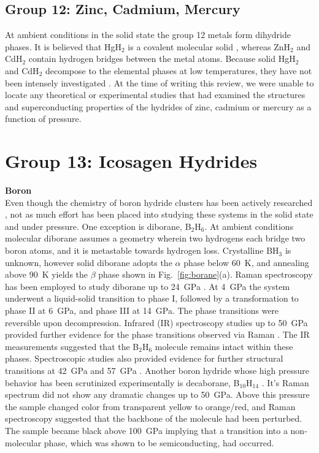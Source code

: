 \documentclass[12pt,letterpaper,oneside]{article}
\begin{document}
\subsection{Group 12: Zinc, Cadmium, Mercury}

At ambient conditions in the solid state the group 12 metals form dihydride phases. It is believed that HgH$_2$ is a covalent molecular solid \cite{Wang:2005a}, whereas ZnH$_2$ and CdH$_2$ contain hydrogen bridges between the metal atoms. Because solid HgH$_2$ and CdH$_2$ decompose to the elemental phases at low temperatures, they have not been intensely investigated  \cite{Shayesteh:2005}. At the time of writing this review, we were unable to locate any theoretical or experimental studies that had examined the structures and superconducting properties of the hydrides of zinc, cadmium or mercury as a function of pressure.

\section{Group 13: Icosagen Hydrides}

\textbf{Boron}\\
Even though the chemistry of boron hydride clusters has been actively researched \cite{Greenwood:1992}, not as much effort has been placed into studying these systems in the solid state and under pressure. One exception is diborane, B$_2$H$_6$. 
At ambient conditions molecular diborane assumes a geometry wherein two hydrogens each bridge two boron atoms, and it is metastable towards hydrogen loss. Crystalline BH$_3$ is unknown, however solid diborane adopts the $\alpha$ phase below 60~K, and annealing above 90~K yields the $\beta$ phase shown in Fig.\ \ref{fig:borane}(a). 
%
Raman spectroscopy has been employed to study diborane up to 24~GPa \cite{Murli:2009a}. At 4~GPa the system underwent a liquid-solid transition to phase I, followed by a transformation to phase II at 6~GPa, and phase III at 14~GPa. The phase transitions were reversible upon decompression. Infrared (IR) spectroscopy studies up to 50~GPa  provided further evidence for the phase transitions observed via Raman \cite{Song:2009-B}. The IR measurements suggested that the B$_2$H$_6$ molecule remains intact within these phases. Spectroscopic studies also provided evidence for further structural transitions at 42~GPa and 57~GPa \cite{Torabi:2015-B}. Another boron hydride whose high pressure behavior has been scrutinized experimentally is decaborane, B$_{10}$H$_{14}$ \cite{Nakano:2002-B}. It's Raman spectrum did not show any dramatic changes up to 50~GPa. Above this pressure the sample changed color from transparent yellow to orange/red, and Raman spectroscopy suggested that the backbone of the molecule had been perturbed. The sample became black above 100~GPa implying that a transition into a non-molecular phase, which was shown to be semiconducting, had occurred. 
\end{document}
